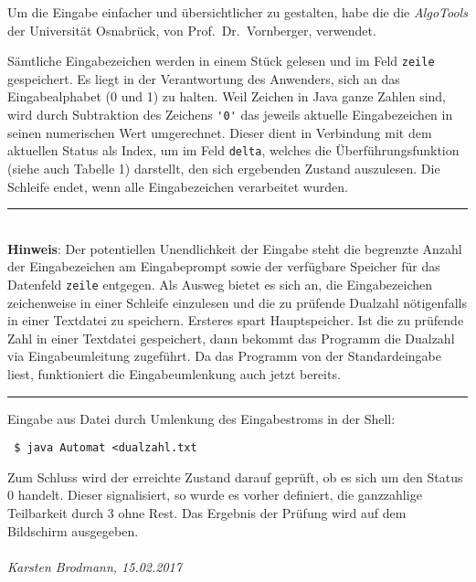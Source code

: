 \documentclass[draft=false]{scrartcl}
\newenvironment{achtung}[1][Achtung]{%
	\rule{\textwidth}{1pt}\\%
	\textbf{#1}: %
}{%
	\\\rule[1ex]{\textwidth}{1pt}%
}
\begin{document}
Um die Eingabe einfacher und übersichtlicher zu gestalten, habe die die \emph{AlgoTools} der Universität Osnabrück, von Prof.\ Dr.\ Vornberger, verwendet. 

Sämtliche Eingabezeichen werden in einem Stück gelesen und im Feld \verb|zeile| gespeichert. Es liegt in der Verantwortung des Anwenders, sich an das Eingabealphabet (0 und 1) zu halten. Weil Zeichen in Java ganze Zahlen sind, wird durch Subtraktion des Zeichens \verb|'0'| das jeweils aktuelle Eingabezeichen in seinen numerischen Wert umgerechnet. Dieser dient in Verbindung mit dem aktuellen Status als Index, um im Feld \verb|delta|, welches die Überführungsfunktion (siehe auch Tabelle 1) darstellt, den sich ergebenden Zustand auszulesen. Die Schleife endet, wenn alle Eingabezeichen verarbeitet wurden.

\begin{achtung}[Hinweis] %
Der potentiellen Unendlichkeit der Eingabe steht die begrenzte Anzahl der Eingabezeichen am Eingabeprompt sowie der verfügbare Speicher für das Datenfeld \verb|zeile| entgegen. Als Ausweg bietet es sich an, die Eingabezeichen zeichenweise in einer Schleife einzulesen und die zu prüfende Dualzahl nötigenfalls in einer Textdatei zu speichern. Ersteres spart Hauptspeicher. Ist die zu prüfende Zahl in einer Textdatei gespeichert, dann bekommt das Programm die Dualzahl via Eingabeumleitung zugeführt. Da das Programm von der Standardeingabe liest, funktioniert die Eingabeumlenkung auch jetzt bereits.
\end{achtung}

 Eingabe aus Datei durch Umlenkung des Eingabestroms in der Shell:

\verb| $ java Automat <dualzahl.txt|

Zum Schluss wird der erreichte Zustand darauf geprüft, ob es sich um den Status 0 handelt. Dieser signalisiert, so wurde es vorher definiert, die ganzzahlige Teilbarkeit durch 3 ohne Rest. Das Ergebnis der Prüfung wird auf dem Bildschirm ausgegeben.
\\\\
\textsl{Karsten Brodmann, 15.02.2017} 
\end{document}
